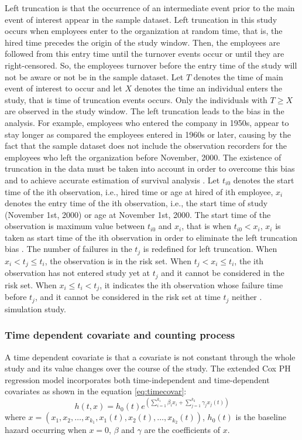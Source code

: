 \documentclass[12pt,letterpaper]{article}
\begin{document}
    Left truncation is that the occurrence of an intermediate event prior to the main event of interest appear in the sample dataset. Left truncation in this study occurs when employees enter to the organization at random time, that is, the hired time precedes the origin of the study window. Then, the employees are followed from this entry time until the turnover events occur or until they are right-censored. So, the employees turnover before the entry time of the study will not be aware or not be in the sample dataset. Let $T$ denotes the time of main event of interest to occur and let $X$ denotes the time an individual enters the study, that is time of truncation events occurs. Only the individuals with $T \geq X$ are observed in the study window. The left truncation leads to the bias in the analysis. For example, employees who entered the company in 1950s, appear to stay longer as compared the employees entered in 1960s or later, causing by the fact that the sample dataset does not include the observation recorders for the employees who left the organization before November, 2000. The existence of truncation in the data must be taken into account in order to overcome this bias and to achieve accurate estimation of survival analysis \citep{carrion2010}. Let $t_{i0}$ denotes the start time of the ith observation, i.e., hired time or age at hired of ith employee, $x_{i}$ denotes the entry time of the ith observation, i.e., the start time of study (November 1st, 2000) or age at November 1st, 2000. The start time of the observation is maximum value between $t_{i0}$ and $x_i$, that is when $t_{i0} < x_i $, $x_i$ is taken as start time of the ith observation in order to eliminate the left truncation bias \citep{allison1995}. The number of failures in the $t_j$ is redefined for left truncation. When $x_i < t_j \le t_i$, the observation is in the risk set. When $t_{j} < x_i \le t_i$, the ith observation has not entered study yet at $t_j$ and it cannot be considered in the risk set. When $x_i \le t_i < t_j$, it indicates the ith observation whose failure time before $t_j$, and it cannot be considered in the risk set at time $t_j$ neither \citep{carrion2010}.
    simulation study.
\subsubsection{Time dependent covariate and counting process}
\label{sec:coxt}
A time dependent covariate is that a covariate is not constant through the whole study and its value changes over the course of the study. The extended Cox PH regression model incorporates both time-independent and time-dependent covariates as shown in the equation \ref{eq:timecovar}:
\begin{equation}
\label{eq:timecovar}
h(t,x)=h_0(t)e^{(\sum_{i=1}^{k_1}\beta_ix_i+\sum_{j=1}^{k_2}\gamma_jx_j(t))}
\end{equation}
where $x=(x_1, x_2, \ldots, x_{k_1}, x_1(t), x_2(t), \ldots, x_{k_2}(t))$, $h_0(t)$ is the baseline hazard occurring when $x=0$, $\beta$ and $\gamma$ are the coefficients of $x$. 
\end{document}
